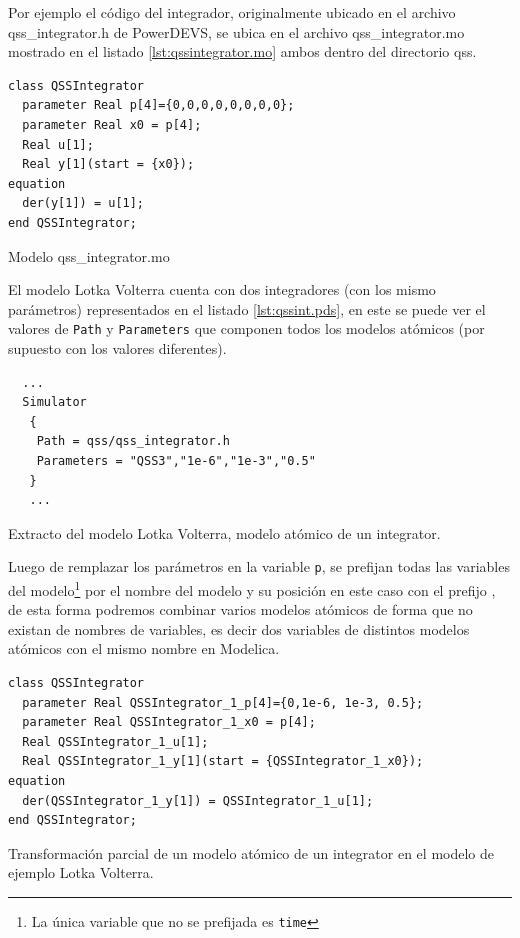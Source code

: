         Por ejemplo el código del integrador, originalmente ubicado en el archivo qss\_integrator.h de PowerDEVS, se ubica en el archivo qss\_integrator.mo mostrado en el listado 
        \ref{lst:qssintegrator.mo} ambos dentro del directorio qss.

\begin{listing}[H]
\begin{verbatim}
class QSSIntegrator
  parameter Real p[4]={0,0,0,0,0,0,0,0};
  parameter Real x0 = p[4];
  Real u[1];
  Real y[1](start = {x0});
equation
  der(y[1]) = u[1];
end QSSIntegrator;
\end{verbatim}
\caption{Modelo qss\_integrator.mo}
\label{lst:qssintegrator.mo}
\end{listing}

        El modelo Lotka Volterra cuenta con dos integradores (con los mismo parámetros) representados en el listado \ref{lst:qssint.pds}, en este se puede ver 
        el valores de \texttt{Path} y \texttt{Parameters} que componen todos los modelos atómicos (por supuesto con los valores diferentes).

\begin{listing}[H]
\begin{verbatim}
  ...
  Simulator
   {
    Path = qss/qss_integrator.h
    Parameters = "QSS3","1e-6","1e-3","0.5"
   }
   ...
\end{verbatim}
\label{lst:qssint.pds}
\caption{Extracto del modelo Lotka Volterra, modelo atómico de un integrator.}
\end{listing}

        Luego de remplazar los parámetros en la variable \texttt{p}, se prefijan todas las variables del modelo\footnote{La única variable que no se prefijada 
        es \texttt{time}} por el nombre del modelo y su posición en este caso con el prefijo 
        , de esta forma podremos combinar varios modelos atómicos de forma que no existan  de nombres de variables,
        es decir dos variables de distintos modelos atómicos con el mismo nombre en Modelica. 

\begin{listing}[H]
\begin{verbatim}
class QSSIntegrator
  parameter Real QSSIntegrator_1_p[4]={0,1e-6, 1e-3, 0.5};
  parameter Real QSSIntegrator_1_x0 = p[4];
  Real QSSIntegrator_1_u[1];
  Real QSSIntegrator_1_y[1](start = {QSSIntegrator_1_x0});
equation
  der(QSSIntegrator_1_y[1]) = QSSIntegrator_1_u[1];
end QSSIntegrator;
\end{verbatim}
\caption{Transformación parcial de un modelo atómico de un integrator en el modelo de ejemplo Lotka Volterra.}
\end{listing}

